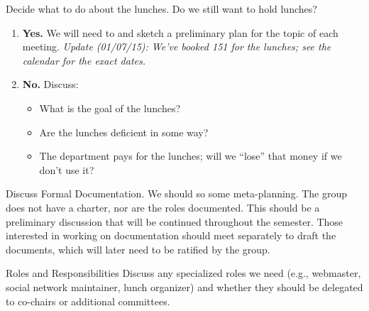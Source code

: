 \documentclass{agenda}
\begin{document}
\begin{agendaitem}{15}{Decide what to do about the lunches.}
    Do we still want to hold lunches?
    \begin{enumerate}
        \item {\bf Yes.} We will need to  and sketch a preliminary 
        plan for the topic of each meeting. \emph{Update (01/07/15): We've booked 151 for the lunches; see the calendar for the exact dates.}
        \item {\bf No.} Discuss:
            \begin{itemize}
                \item What is the goal of the lunches?
                \item Are the lunches deficient in some way?
                \item The department pays for the lunches; will we ``lose'' that money if we don't use it?
            \end{itemize}
    \end{enumerate}
\end{agendaitem}

\begin{agendaitem}{10}{Discuss Formal Documentation.}
    We should so some meta-planning. The group does not have a charter, nor are the roles documented. This should be a preliminary discussion that will be continued throughout the semester. Those interested in working on documentation should meet separately to draft the documents, which will later need to be ratified by the group.
\end{agendaitem}


\begin{agendaitem}{5}{Roles and Responsibilities}
Discuss any specialized roles we need (e.g., webmaster, social network maintainer, lunch organizer) and whether they should be delegated to co-chairs or additional committees.
\end{agendaitem}
\end{document}
